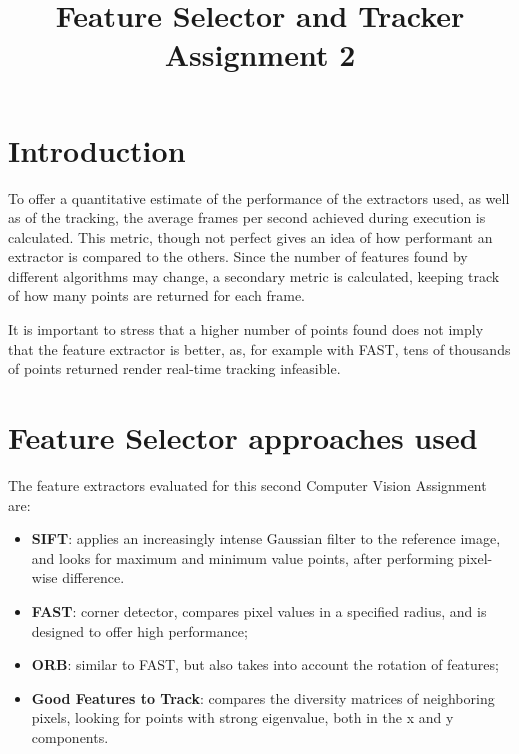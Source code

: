 \documentclass[conference]{IEEEtran}
\begin{document}
\title{Feature Selector and Tracker \\ Assignment 2}

\author{
}

\maketitle


\section{Introduction}

To offer a quantitative estimate of the performance of the extractors used, as well as of the tracking, 
the average frames per second achieved during execution is calculated. This metric, though not perfect 
gives an idea of how performant an extractor is compared to the others.
Since the number of features found by different algorithms may change, a secondary metric is calculated, 
keeping track of how many points are returned for each frame.

It is important to stress that a higher number of points found does not imply that the feature 
extractor is better, as, for example with FAST, tens of thousands of points returned render 
real-time tracking infeasible.


\section{Feature Selector approaches used}

The feature extractors evaluated for this second Computer Vision Assignment are: 
\begin{itemize}
    \item \textbf{SIFT}: applies an increasingly intense Gaussian filter to the reference image, and looks for maximum and minimum value points, after performing pixel-wise difference.
    \item \textbf{FAST}: corner detector, compares pixel values in a specified radius, and is designed to offer high performance; 
    \item \textbf{ORB}: similar to FAST, but also takes into account the rotation of features;
    \item \textbf{Good Features to Track}: compares the diversity matrices of neighboring pixels, looking for points with strong eigenvalue, both in the x and y components.
\end{itemize}
\end{document}
